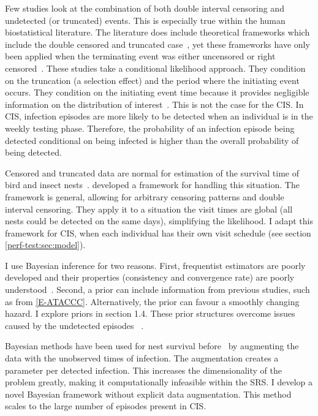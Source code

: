 \documentclass[thesis.tex]{subfiles}
\begin{document}
Few studies look at the combination of both double interval censoring and undetected (or truncated) events.
This is especially true within the human biostatistical literature.
The literature does include theoretical frameworks which include the double censored and truncated case~\autocite{turnbullEmpirical,dempsterMaximum}, yet these frameworks have only been applied when the terminating event was either uncensored or right censored~\autocite{sunEmpirical,bacchettiNonparametric}.
These studies \autocite[and elsewhere, e.g.:][]{shenNonparametric} take a conditional likelihood approach.
They condition on the truncation (a selection effect) and the period where the initiating event occurs.
They condition on the initiating event time because it provides negligible information on the distribution of interest~.
This is not the case for the CIS.
In CIS, infection episodes are more likely to be detected when an individual is in the weekly testing phase.
Therefore, the probability of an infection episode being detected conditional on being infected is higher than the overall probability of being detected.

Censored and truncated data are normal for estimation of the survival time of bird and insect nests~\autocite{heiseyABCs}.
\textcite{heiseyModelling} developed a framework for handling this situation.
The framework is general, allowing for arbitrary censoring patterns and double interval censoring.
They apply it to a situation the visit times are global (all nests could be detected on the same days), simplifying the likelihood.
I adapt this framework for CIS, when each individual has their own visit schedule (see section \cref{perf-test:sec:model}).

I use Bayesian inference for two reasons.
First, frequentist estimators are poorly developed and their properties (\eg consistency and convergence rate) are poorly understood~\autocite{sunAnalysis,dengNonparametric}.
Second, a prior can include information from previous studies, such as from \cref{E-ATACCC}.
Alternatively, the prior can favour a smoothly changing hazard.
I explore priors in section 1.4.
These prior structures overcome issues caused by the undetected episodes ~\autocite{caoBias}.

Bayesian methods have been used for nest survival before~\autocite{heBayesiana,heBayesian,caoModeling} by augmenting the data with the unobserved times of infection.
The augmentation creates a parameter per detected infection.
This increases the dimensionality of the problem greatly, making it computationally infeasible within the SRS.
I develop a novel Bayesian framework without explicit data augmentation.
This method scales to the large number of episodes present in CIS.
\end{document}
